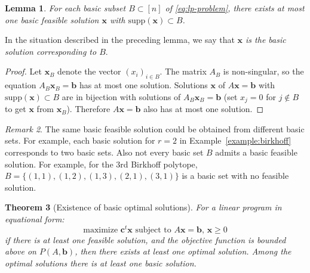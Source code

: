 \documentclass{amsbook}
\newcommand{\xx}{\mathbf x}
\newcommand{\cc}{\mathbf c}
\newcommand{\bb}{\mathbf b}
\newcommand{\supp}{\mathrm{supp}}
\newtheorem{theorem}{Theorem}[section]
\newtheorem{lemma}[theorem]{Lemma}
\theoremstyle{definition}
\theoremstyle{remark}
\newtheorem{remark}[theorem]{Remark}
\begin{document}
\begin{lemma}
  \label{lemma:unique-for-B}
  For each basic subset $B\subset [n]$ of \eqref{eq:lp-problem}, there exists at most one basic feasible solution $\xx$ with $\supp(\xx)\subset B$.
\end{lemma}
In the situation described in the preceding lemma, we say that \emph{$\xx$ is the basic solution corresponding to $B$}.
\begin{proof}
  Let $\xx_B$ denote the vector $(x_i)_{i\in B}$.
  The matrix $A_B$ is non-singular, so the equation $A_B\xx_B=\bb$ has at most one solution.
  Solutions $\xx$ of $A\xx=\bb$ with $\supp(\xx)\subset B$ are in bijection with solutions of $A_B\xx_B=\bb$ (set $x_j=0$ for $j\notin B$ to get $\xx$ from $\xx_B$).
  Therefore $A\xx=\bb$ also has at most one solution.
\end{proof}
\begin{remark}
  The same basic feasible solution could be obtained from different basic sets.
  For example, each basic solution for $r=2$ in Example~\ref{example:birkhoff} corresponds to two basic sets.
  Also not every basic set $B$ admits a basic feasible solution.
  For example, for the $3$rd Birkhoff polytope, $B=\{(1,1),(1,2),(1,3),(2,1),(3,1)\}$ is a basic set with no feasible solution.
\end{remark}
\begin{theorem}
  [Existence of basic optimal solutions]
  \label{theorem:existence-of-basic-solutions}
  For a linear program in equational form:
  \begin{displaymath}
    \text{maximize $\cc^t\xx$ subject to $A\xx=\bb$, $\xx\geq 0$}
  \end{displaymath}
  if there is at least one feasible solution, and the objective function is bounded above on $P(A,\bb)$, then there exists at least one optimal solution.
  Among the optimal solutions there is at least one basic solution.
\end{theorem}
\end{document}
